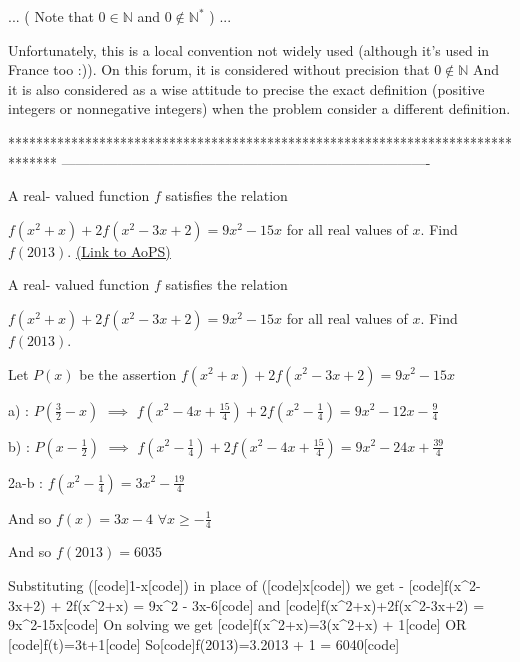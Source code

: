 \begin{solution}
	\begin{tcolorbox}...
( Note that $0\in\mathbb{N}$ and $0\notin\mathbb{N}^*$ ) 
...
\end{tcolorbox}
Unfortunately, this is a local convention not widely used (although it's used in France too :)).
On this forum, it is considered without precision that $0\notin \mathbb N$
And it is also considered as a wise attitude to precise the exact definition (positive integers or nonnegative integers) when the problem consider a different definition.
\end{solution}
*******************************************************************************
-------------------------------------------------------------------------------

\begin{problem}
	A real- valued function $f$ satisfies the relation 

$ f(x^2+x) + 2f(x^2-3x+2) = 9x^2-15x$ for all real values of $x$. Find $f(2013)$.
	\flushright \href{https://artofproblemsolving.com/community/c6h560865}{(Link to AoPS)}
\end{problem}



\begin{solution}
	\begin{tcolorbox}A real- valued function $f$ satisfies the relation 

$ f(x^2+x) + 2f(x^2-3x+2) = 9x^2-15x$ for all real values of $x$. Find $f(2013)$.\end{tcolorbox}
Let $P(x)$ be the assertion $f(x^2+x)+2f(x^2-3x+2)=9x^2-15x$

a) : $P(\frac 32-x)$ $\implies$ $f(x^2-4x+\frac{15}4)+2f(x^2-\frac 14)=9x^2-12x-\frac 94$

b) : $P(x-\frac 12)$ $\implies$ $f(x^2-\frac 14)+2f(x^2-4x+\frac{15}4)=9x^2-24x+\frac{39}4$

2a-b : $f(x^2-\frac 14)=3x^2-\frac{19}4$

And so $f(x)=3x-4$ $\forall x\ge-\frac 14$

And so $\boxed{f(2013)=6035}$
\end{solution}



\begin{solution}
	Substituting ([code]1-x[\/code]) in place of  ([code]x[\/code])  we get - 
[code]f(x^2-3x+2) + 2f(x^2+x) = 9x^2 - 3x-6[\/code] and
[code]f(x^2+x)+2f(x^2-3x+2) = 9x^2-15x[\/code]
On solving we get
[code]f(x^2+x)=3(x^2+x) + 1[\/code] OR
[code]f(t)=3t+1[\/code]
So[code]f(2013)=3.2013 + 1 = 6040[\/code]
\end{solution}



